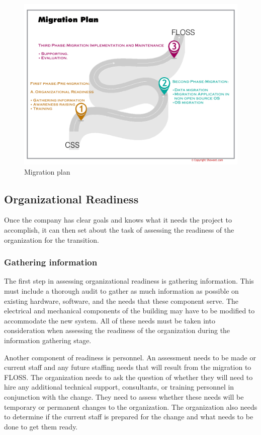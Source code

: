 \begin{figure}[H]
 \centering
    \includegraphics[scale=0.6,angle=90]{img/migrationplan.png}
      \caption{Migration plan}
      \label{fig:migrationplan}
    \end{figure}
    
    \subsection{Organizational Readiness}
    
    Once the company has clear goals and knows what it needs the project to accomplish, it can then set about the task of assessing the readiness of the organization for the transition.
    
    \subsubsection{Gathering information}
    The first step in assessing organizational readiness is gathering information. 
    This must include a thorough audit to gather as much information as possible on existing hardware, software, and the needs that these component serve. The electrical and mechanical components of the building may have to be modified to accommodate the new system. All of these needs must be taken into consideration when assessing the readiness of the organization during the information gathering stage.
    
    Another component of readiness is personnel. An assessment needs to be made or current staff and any future staffing needs that will result from the migration to FLOSS. The organization needs to ask the question of whether they will need to hire any additional technical support, consultants, or training personnel in conjunction with the change. They need to assess whether these needs will be temporary or permanent changes to the organization. The organization also needs to determine if the current staff is prepared for the change and what needs to be done to get them ready. 
    
